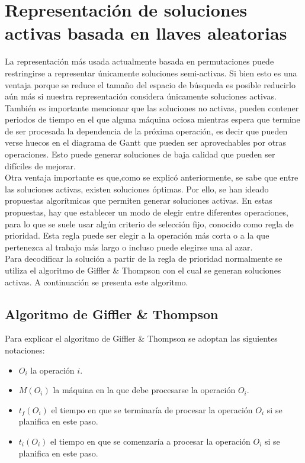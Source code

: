 \section{Representación de soluciones activas basada en llaves aleatorias}
La representación más usada actualmente basada en permutaciones puede restringirse a representar únicamente soluciones semi-activas. Si bien esto es una ventaja porque se reduce el tamaño del espacio de búsqueda es posible reducirlo aún más si nuestra representación considera únicamente soluciones activas. 
%
También es importante mencionar que las soluciones no activas, pueden contener periodos de tiempo en el que alguna máquina ociosa mientras espera que termine de ser procesada la dependencia de la próxima operación, es decir que pueden verse huecos en el diagrama de Gantt que pueden ser aprovechables por otras operaciones. Esto puede generar soluciones de baja calidad que pueden ser difíciles de mejorar.\\
%
Otra ventaja importante es que,como se explicó anteriormente, se sabe que entre las soluciones activas, existen soluciones óptimas. Por ello, se han ideado propuestas algorítmicas que permiten generar soluciones activas. En estas propuestas, hay que establecer un modo de elegir entre diferentes operaciones, para lo que se suele usar algún criterio de selección fijo, conocido como regla de prioridad. Esta regla puede ser elegir a la operación más corta o a la que pertenezca al trabajo más largo o incluso puede elegirse una al azar.\\
%
Para decodificar la solución a partir de la regla de prioridad normalmente se utiliza el algoritmo de Giffler \& Thompson \cite{Giffler1960} con el cual se generan 
soluciones activas. A continuación se presenta este algoritmo.

\subsection{Algoritmo de Giffler \& Thompson}
Para explicar el algoritmo de Giffler \& Thompson se adoptan las siguientes notaciones:
\begin{itemize}
    \item $O_i$ la operación $i$.
    \item $M(O_i)$ la máquina en la que debe procesarse la operación $O_i$.
    \item $t_f(O_i)$ el tiempo en que se terminaría de procesar la operación $O_i$ si se planifica en este paso.
    \item $t_i(O_i)$ el tiempo en que se comenzaría a procesar la operación $O_i$ si se planifica en este paso.
\end{itemize}


